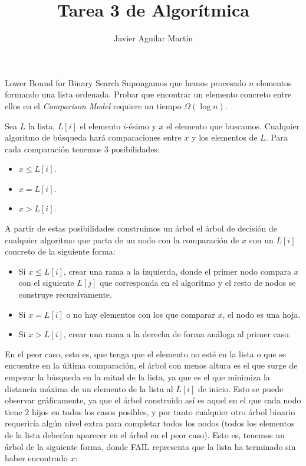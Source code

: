 \documentclass[twoside]{article}
\begin{document}
\title{Tarea 3 de Algorítmica}
\author{Javier Aguilar Martín}
\maketitle


\begin{ejercicio}{Lower Bound for Binary Search}
Supongamos que hemos procesado $n$ elementos formando una lista ordenada. Probar que encontrar un elemento concreto entre ellos en el \emph{Comparison Model} requiere un tiempo $\Omega(\log n)$. 
\end{ejercicio}
\begin{solucion}
Sea $L$ la lista, $L[i]$ el elemento $i$-ésimo y $x$ el elemento que buscamos. Cualquier algoritmo de búsqueda hará comparaciones entre $x$ y los elementos de $L$. Para cada comparación tenemos 3 posibilidades:
\begin{itemize}
\item $x\leq L[i]$. 
\item $x=L[i]$.
\item $x>L[i]$.
\end{itemize}
A partir de estas posibilidades construimos un árbol el árbol de decisión de cualquier algoritmo que parta de un nodo con la comparación de $x$ con un $L[i]$ concreto de la siguiente forma:
\begin{itemize}
\item Si $x\leq L[i]$, crear una rama a la izquierda, donde el primer nodo compara $x$ con el siguiente $L[j]$ que corresponda en el algoritmo y el resto de nodos se construye recursivamente.
\item Si $x=L[i]$ o no hay elementos con los que comparar $x$, el nodo es una hoja.
\item Si $x>L[i]$, crear una rama a la derecha de forma análoga al primer caso. 
\end{itemize}
En el peor caso, esto es, que tenga que el elemento no esté en la lista o que se encuentre en la última comparación, el árbol con menos altura es el que surge de empezar la búsqueda en la mitad de la lista, ya que es el que minimiza la distancia máxima de un elemento de la lista al $L[i]$ de inicio. Esto se puede observar gráficamente, ya que el árbol construido así es aquel en el que cada nodo tiene 2 hijos en todos los casos posibles, y por tanto cualquier otro árbol binario requeriría algún nivel extra para completar todos los nodos (todos los elementos de la lista deberían aparecer en el árbol en el peor caso). Esto es, tenemos un árbol de la siguiente forma, donde FAIL representa que la lista ha terminado sin haber encontrado $x$:


\end{solucion}
\end{document}
